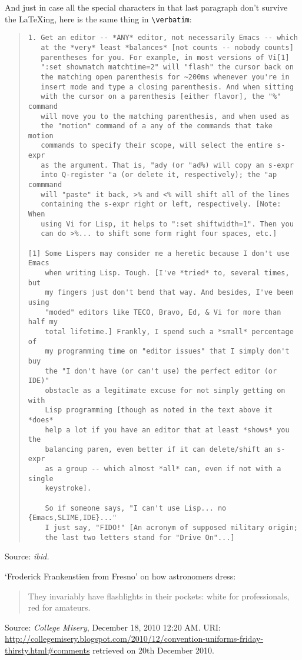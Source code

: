 \documentclass[a4paper]{article}
\begin{document}
And just in case all the special characters in that last paragraph don't
survive the \LaTeX ing, here is the same thing in \verb,\verbatim,:
\begin{quote}
\begin{verbatim}
1. Get an editor -- *ANY* editor, not necessarily Emacs -- which
   at the *very* least *balances* [not counts -- nobody counts]
   parentheses for you. For example, in most versions of Vi[1]
   ":set showmatch matchtime=2" will "flash" the cursor back on
   the matching open parenthesis for ~200ms whenever you're in
   insert mode and type a closing parenthesis. And when sitting
   with the cursor on a parenthesis [either flavor], the "%" command
   will move you to the matching parenthesis, and when used as
   the "motion" command of a any of the commands that take motion
   commands to specify their scope, will select the entire s-expr
   as the argument. That is, "ady (or "ad%) will copy an s-expr
   into Q-register "a (or delete it, respectively); the "ap commmand
   will "paste" it back, >% and <% will shift all of the lines
   containing the s-expr right or left, respectively. [Note: When
   using Vi for Lisp, it helps to ":set shiftwidth=1". Then you
   can do >%... to shift some form right four spaces, etc.] 

[1] Some Lispers may consider me a heretic because I don't use Emacs
    when writing Lisp. Tough. [I've *tried* to, several times, but
    my fingers just don't bend that way. And besides, I've been using
    "moded" editors like TECO, Bravo, Ed, & Vi for more than half my
    total lifetime.] Frankly, I spend such a *small* percentage of
    my programming time on "editor issues" that I simply don't buy
    the "I don't have (or can't use) the perfect editor (or IDE)"
    obstacle as a legitimate excuse for not simply getting on with
    Lisp programming [though as noted in the text above it *does*
    help a lot if you have an editor that at least *shows* you the
    balancing paren, even better if it can delete/shift an s-expr
    as a group -- which almost *all* can, even if not with a single
    keystroke].

    So if someone says, "I can't use Lisp... no {Emacs,SLIME,IDE}..."
    I just say, "FIDO!" [An acronym of supposed military origin;
    the last two letters stand for "Drive On"...]
\end{verbatim}
\end{quote}
Source: {\it ibid.}
\medskip

`Froderick Frankenstien from Fresno' on how astronomers dress:
\begin{quote}
	They invariably have flashlights in their pockets: white for
	professionals, red for amateurs.
\end{quote}
Source: \emph{College Misery}, December 18, 2010 12:20 AM.  URI:
\url{http://collegemisery.blogspot.com/2010/12/convention-uniforms-friday-thirsty.html#comments}
retrieved on 20th December 2010.
\medskip
\end{document}
